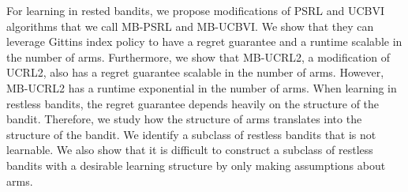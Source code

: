 For learning in rested bandits, we propose modifications of PSRL and UCBVI algorithms that we call MB-PSRL and MB-UCBVI.
We show that they can leverage Gittins index policy to have a regret guarantee and a runtime scalable in the number of arms.
Furthermore, we show that MB-UCRL2, a modification of UCRL2, also has a regret guarantee scalable in the number of arms.
However, MB-UCRL2 has a runtime exponential in the number of arms.
When learning in restless bandits, the regret guarantee depends heavily on the structure of the bandit.
Therefore, we study how the structure of arms translates into the structure of the bandit.
We identify a subclass of restless bandits that is not learnable.
We also show that it is difficult to construct a subclass of restless bandits with a desirable learning structure by only making assumptions about arms.
